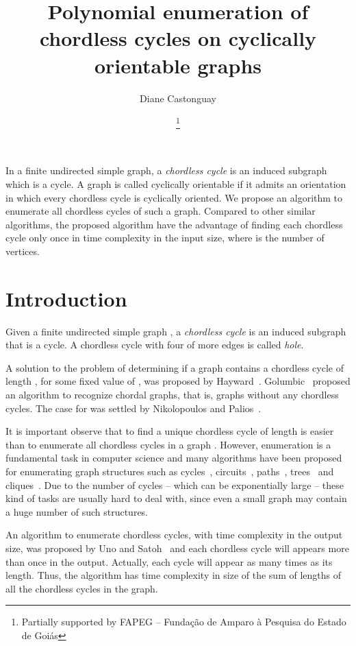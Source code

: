 \documentclass{lawcg}
\title{Polynomial enumeration of chordless cycles on cyclically orientable graphs}
\author{Diane Castonguay  \and
       \speaker{Elis\^{a}ngela Silva Dias}\thanks{Partially supported by FAPEG -- Funda\c{c}\~{a}o de Amparo \`{a} Pesquisa do Estado de Goi\'{a}s}}
\institute{{\it \{diane,elisangela\}@inf.ufg.br} \\Instituto de Inform\'{a}tica -- Universidade Federal de Goi\'{a}s -- UFG}
\begin{document}
\maketitle

In a finite undirected simple graph, a {\it chordless cycle} is an induced subgraph which is a cycle. A graph is called cyclically orientable if it admits an orientation in which every chordless cycle is cyclically oriented. We propose an algorithm to enumerate all chordless cycles of such a graph. Compared to other similar algorithms, the proposed algorithm have the advantage of finding each chordless cycle only once in time complexity  in the input size, where  is the number of vertices.

\section{Introduction}
\label{sec:Introduction}

Given a finite undirected simple graph , a {\it chordless cycle} is an induced subgraph that is a cycle. A chordless cycle with four of more edges is called {\it hole}.

A solution to the problem of determining if a graph contains a chordless cycle of length , for some fixed value of , was proposed by Hayward~\cite{H1987}. Golumbic~\cite{G1980} proposed an algorithm to recognize chordal graphs, that is, graphs without any chordless cycles. The case for  was settled by Nikolopoulos and Palios~\cite{NP2007}. 

It is important observe that to find a unique chordless cycle of length  is easier than to enumerate all chordless cycles in a graph . However, enumeration is a fundamental task in computer science and many algorithms have been proposed for enumerating graph structures such as cycles~\cite{RT1975,W2008}, circuits~\cite{B2010,T1973}, paths~\cite{HH2006,RT1975}, trees~\cite{KR2000,RT1975} and cliques~\cite{MU2004,TTT2006}. Due to the number of cycles -- which can be exponentially large -- these kind of tasks are usually hard to deal with, since even a small graph may contain a huge number of such structures. 







An algorithm to enumerate chordless cycles, with  time complexity in the output size, was proposed by Uno and Satoh~\cite{U2014} and each chordless cycle will appears more than once in the output. Actually, each cycle will appear as many times as its length. Thus, the algorithm has  time complexity in size of the sum of lengths of all the chordless cycles in the graph.
\end{document}
